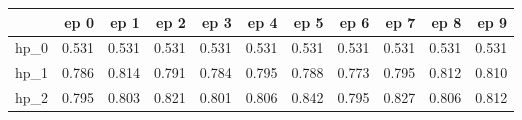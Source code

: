 \begin{tabular}{lrrrrrrrrrr}
\toprule
{} &   ep 0 &   ep 1 &   ep 2 &   ep 3 &   ep 4 &   ep 5 &   ep 6 &   ep 7 &   ep 8 &   ep 9 \\
\midrule
hp\_0 &  0.531 &  0.531 &  0.531 &  0.531 &  0.531 &  0.531 &  0.531 &  0.531 &  0.531 &  0.531 \\
hp\_1 &  0.786 &  0.814 &  0.791 &  0.784 &  0.795 &  0.788 &  0.773 &  0.795 &  0.812 &  0.810 \\
hp\_2 &  0.795 &  0.803 &  0.821 &  0.801 &  0.806 &  0.842 &  0.795 &  0.827 &  0.806 &  0.812 \\
\bottomrule
\end{tabular}
